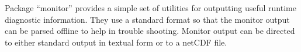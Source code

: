 

Package ``monitor'' provides a simple set of utilities for outputting
useful runtime diagnostic information. They use a standard format so
that the monitor output can be parsed offline to help in trouble
shooting. Monitor output can be directed to either standard output in
textual form or to a netCDF file.

